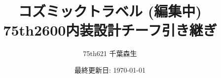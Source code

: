 \usepackage{docmute}
\usepackage{graphicx,xcolor}
\usepackage{siunitx}
\usepackage{tikz}
\usepackage[subrefformat=parens]{subcaption}
\usepackage[pdfusetitle,hidelinks]{hyperref}
\usepackage{pxjahyper}

\usepackage{prettyref}
\newcommand\fullref[1]{\hyperref[#1]{\prettyref{#1}}}

\usetikzlibrary{intersections,calc,arrows.meta}

\newcommand*{\includefig}[5][c]{%
    \begin{minipage}[#1]{#2\linewidth}
        \centering
        \texttt{[image: \#5]}
        \subcaption{#3}
        \label{#4}
    \end{minipage}
}
\newenvironment{imageHere}[2][htbp]{\def\@imageHereTmp{#2}%
    \begin{figure}[#1]
        \centering
}{%
        \caption{\@imageHereTmp}
        \label{figs:\@imageHereTmp}
    \end{figure}
}

\title{
    コズミックトラベル (編集中) \\
    \large 75th2600内装設計チーフ引き継ぎ
}
\author{75th621 千葉森生}
\date{最終更新日: \today}